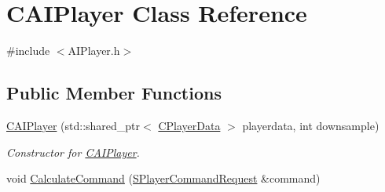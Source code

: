 \hypertarget{classCAIPlayer}{}\section{C\+A\+I\+Player Class Reference}
\label{classCAIPlayer}


{\ttfamily \#include $<$A\+I\+Player.\+h$>$}

\subsection*{Public Member Functions}
\begin{DoxyCompactItemize}
\item 
\hyperlink{classCAIPlayer_ab8b156d5fdce4d5ecf24624523fe5337}{C\+A\+I\+Player} (std\+::shared\+\_\+ptr$<$ \hyperlink{classCPlayerData}{C\+Player\+Data} $>$ playerdata, int downsample)
\begin{DoxyCompactList}\small\item\em Constructor for \hyperlink{classCAIPlayer}{C\+A\+I\+Player}. \end{DoxyCompactList}\item 
void \hyperlink{classCAIPlayer_ae2742efd250c7d6c00b659ccc29c4be3}{Calculate\+Command} (\hyperlink{structSPlayerCommandRequest}{S\+Player\+Command\+Request} \&command)
\end{DoxyCompactItemize}
